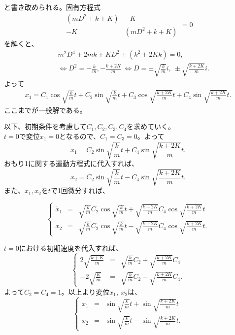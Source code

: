 \documentclass[a4paper,11pt,fleqn]{jarticle}
\begin{document}
と書き改められる。固有方程式
\[
\begin{array}{|cc|}
(mD^2+k+K) & -K \\
-K & (mD^2+k+K)
\end{array}
=0
\]
を解くと、
\begin{eqnarray*}
&&m^2D^4 + 2m{k+K}D^2 + (k^2 + 2Kk)=0, \\
&&\Leftrightarrow D^2 = -\frac{k}{m},-\frac{k+2K}{m}\ \Leftrightarrow D = \pm\sqrt{\frac{k}{m}}i,\ \pm\sqrt{\frac{k+2K}{m}}i.
\end{eqnarray*}
よって
\begin{eqnarray*}
x_1=C_1\cos\sqrt{\frac{k}{m}}t+C_2\sin\sqrt{\frac{k}{m}}t+C_3\cos\sqrt{\frac{k+2K}{m}}t+C_4\sin\sqrt{\frac{k+2K}{m}}t.
\end{eqnarray*}
ここまでが一般解である。

以下、初期条件を考慮して$C_1,C_2,C_3,C_4$を求めていく。\\
$t=0$で変位$x_1 = 0$となるので、$C_1 = C_3 = 0$。よって
\[
x_1=C_2\sin\sqrt{\frac{k}{m}}t+C_4\sin\sqrt{\frac{k+2K}{m}}t.
\]
おもり1に関する運動方程式に代入すれば、
\[
x_2=C_2\sin\sqrt{\frac{k}{m}}t-C_4\sin\sqrt{\frac{k+2K}{m}}t.
\]
また、$x_1,x_2$を$t$で1回微分すれば、

\[
\left\{
\begin{array}{rcl}
\dot{x}_1 &=& \sqrt{\frac{k}{m}}C_2\cos\sqrt{\frac{k}{m}}t + \sqrt{\frac{k+2K}{m}}C_4\cos\sqrt{\frac{k+2K}{m}}t\\
\dot{x}_2 &=& \sqrt{\frac{k}{m}}C_2\cos\sqrt{\frac{k}{m}}t - \sqrt{\frac{k+2K}{m}}C_4\cos\sqrt{\frac{k+2K}{m}}t.
\end{array}
\right.
\]

$t=0$における初期速度を代入すれば、
\[
\left\{
\begin{array}{rcl}
2\sqrt{\frac{k+K}{m}} &=& \sqrt{\frac{k}{m}}C_2 + \sqrt{\frac{k+2K}{m}}C_4\\
-2\sqrt{\frac{K}{m}} &=& \sqrt{\frac{k}{m}}C_2 - \sqrt{\frac{k+2K}{m}}C_4.
\end{array}
\right.
\]
よって$C_2 = C_4 = 1$。以上より変位$x_1,\ x_2$は、
\[
\left\{
\begin{array}{rcl}
x_1 &=& \sin\sqrt{\frac{k}{m}}t+\sin\sqrt{\frac{k+2K}{m}}t\\
x_2 &=& \sin\sqrt{\frac{k}{m}}t-\sin\sqrt{\frac{k+2K}{m}}t.
\end{array}
\right.
\]


\newpage
\end{document}
